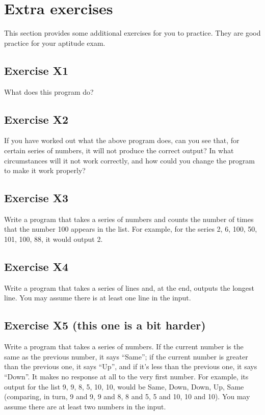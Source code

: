 \section{Extra exercises}
\label{sec:additional-exercises}

This section provides some additional exercises for you to
practice. They are good practice for your aptitude exam. 

\subsection*{Exercise X1}

What does this program do?


\subsection*{Exercise X2}

If you have worked out what the above program does, can you
see that, for certain series of numbers, it will not produce the correct
output?  In what circumstances will it not work correctly, and how could
you change the program to make it work properly?

\subsection*{Exercise X3}

Write a program that takes a series of numbers and counts
the number of times that the number 100 appears in the list.  For example,
for the series 2, 6, 100, 50, 101, 100, 88, it would output 2.

\subsection*{Exercise X4}

Write a program that takes a series of lines and,
at the end, outputs the longest line.
You may assume there is at least one line in the input.

\subsection*{Exercise X5 (this one is a bit harder)}

Write a program that takes
a series of numbers.  If the
current number is the same as the previous number, it says ``Same'';
if the current number is greater than the previous one, it says ``Up'',
and if it's less than the previous one, it says ``Down''.
It makes no response at all to the
very first number.  For example, its output for the list 9, 9, 8, 5, 10, 10,
would be Same, Down, Down, Up, Same
(comparing, in turn, 9 and 9, 9 and 8, 8 and 5, 5 and 10, 10 and 10).
You may assume there are at least two numbers in the input.


